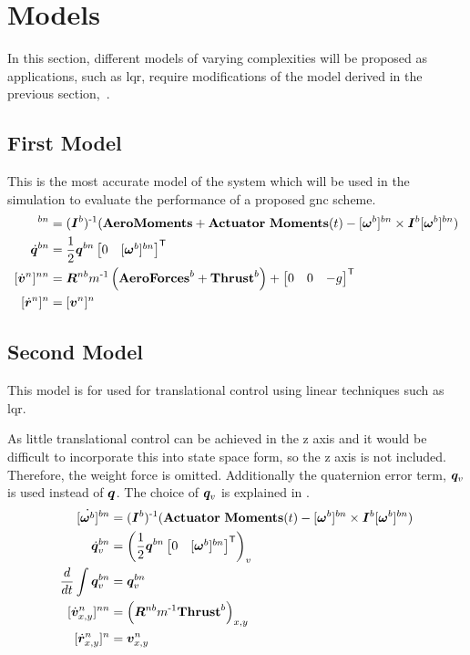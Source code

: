\section{Models} \label{sec:Models}
%
In this section, different models of varying complexities will be proposed as applications, such as \gls{lqr}, require modifications of the model derived in the previous section,~.
%
\subsection{First Model}
This is the most accurate model of the system which will be used in the simulation to evaluate the performance of a proposed \gls{gnc} scheme.
\begin{align}
    [\dot{\m \omega^b}]^{bn} &= (\m I^b)\inv ( \mathbf{AeroMoments} + \mathbf{Actuator\ Moments}(t) - [\m \omega^b]^{bn} \times \m I^b [\m \omega^b]^{bn} ) \\
    \label{eq:qdot}
    \dot{\q}^{bn} &=\frac{1}{2} \q^{bn}
    \begin{bmatrix}
        0 & [\m \omega^b]^{bn}
    \end{bmatrix}\tran \\
    [\dot{\m v}^n]^{nn} &= \m R^{nb} m\inv \left( \mathbf{AeroForces}^b + \mathbf{Thrust}^b \right) +
    \begin{bmatrix}
        0 & 0 & -g
    \end{bmatrix}\tran \\
    \label{eq:rdot}
    [\dot{\m r}^n]^n &= [\m v^n]^n 
\end{align}
%
\subsection{Second Model} 
\label{Position Model}
This model is for used for translational control using linear techniques such as \gls{lqr}.

As little translational control can be achieved in the z axis and it would be difficult to incorporate this into state space form, so the z axis is not included. 
Therefore, the weight force is omitted.
Additionally the quaternion error term, $\bm q_v$ is used instead of $\bm q$. 
The choice of $\bm q_v$ is explained in .
\begin{align}
    \label{eq:alpha}
    [\dot{\m \omega^b}]^{bn} &= (\m I^b)\inv (\mathbf{Actuator\ Moments}(t) - [\m \omega^b]^{bn} \times \m I^b [\m \omega^b]^{bn} ) \\
    \label{eq:qdotv}
    \dot{\q}^{bn}_v &= \left( \frac{1}{2} \q^{bn}
    \begin{bmatrix}
        0 & [\m \omega^b]^{bn}
    \end{bmatrix}\tran\right)_v\\
    \label{eq:qintv}
    \frac{d}{dt} \int \q^{bn}_v &= \q^{bn}_v \\
    [\dot{\m v}^n_{x,y}]^{nn} &= \left( \m R^{nb} m\inv \mathbf{Thrust}^b \right)_{x,y}\\
    [\dot{\m r}^n_{x,y}]^n &= \m v^n_{x,y}
\end{align}
%
